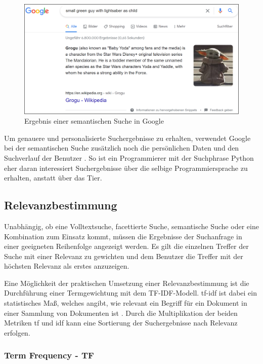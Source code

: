 \begin{figure}[H]
    \centering
    \includegraphics[width=1\linewidth]{images/baby_yoda.png}
    \caption{Ergebnis einer semantischen Suche in Google}
    \label{fig:baby_yoda_google}
\end{figure}

Um genauere und personalisierte Suchergebnisse zu erhalten, verwendet Google bei der semantischen Suche zusätzlich noch die persönlichen Daten und den Suchverlauf der Benutzer \cite{MichalPecanek.2020b}. So ist ein Programmierer mit der Suchphrase \glqq Python\grqq{} eher daran interessiert Suchergebnisse über die selbige Programmiersprache zu erhalten, anstatt über das Tier.

\subsection{Relevanzbestimmung\label{subsec2.3.5:Unterunterpunkt-5}}

Unabhängig, ob eine Volltextsuche, facettierte Suche, semantische Suche oder eine Kombination zum Einsatz kommt, müssen die Ergebnisse der Suchanfrage in einer geeigneten Reihenfolge angezeigt werden. Es gilt die einzelnen Treffer der Suche mit einer Relevanz zu gewichten und dem Benutzer die Treffer mit der höchsten Relevanz als erstes anzuzeigen.

Eine Möglichkeit der praktischen Umsetzung einer Relevanzbestimmung ist die Durchführung einer Termgewichtung mit dem \glqq TF-IDF\grqq{}-Modell. \glqq \gls{tf-idf}\grqq{} ist dabei ein statistisches Maß, welches angibt, wie relevant ein Begriff für ein Dokument in einer Sammlung von Dokumenten ist \cite{BrunoStecanella.2019}. Durch die Multiplikation der beiden Metriken \glqq \gls{tf}\grqq{} und \glqq \gls{idf}\grqq{} kann eine Sortierung der Suchergebnisse nach Relevanz erfolgen.

\subsubsection{Term Frequency - TF}

